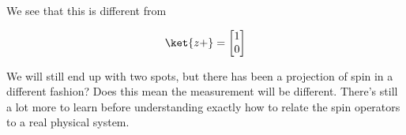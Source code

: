 We see that this is different from

\begin{align}\label{eqn:PHY356Foct19:2012}
\ket{z+} = 
\begin{bmatrix}
1 \\
0
\end{bmatrix}
\end{align}

We will still end up with two spots, but there has been a projection of spin in a different fashion?  Does this mean the measurement will be different.  There's still a lot more to learn before understanding exactly how to relate the spin operators to a real physical system.

\EndNoBibArticle
